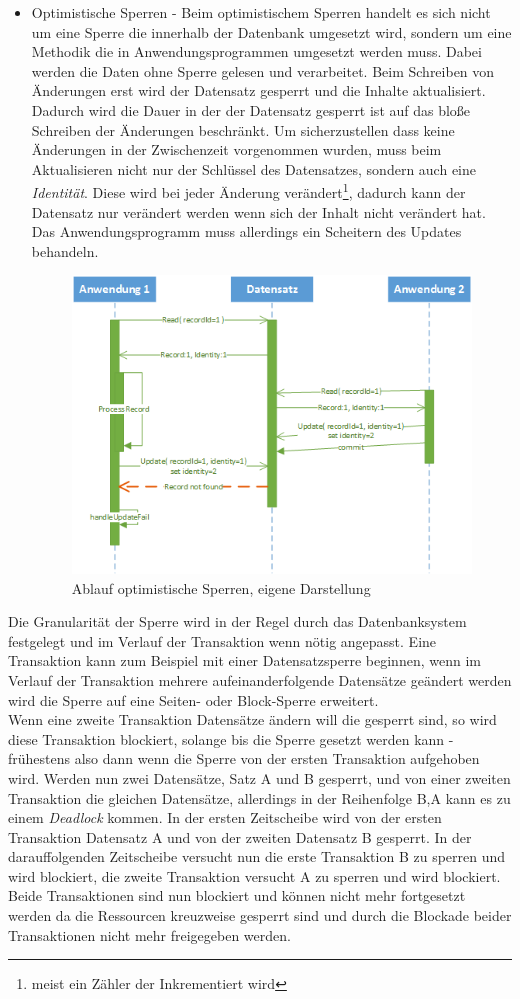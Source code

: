 \begin{itemize}
	\item Optimistische Sperren - Beim optimistischem Sperren handelt es sich nicht um eine Sperre die innerhalb der Datenbank umgesetzt wird, sondern um eine Methodik die in Anwendungsprogrammen umgesetzt werden muss. Dabei werden die Daten ohne Sperre gelesen und verarbeitet. Beim Schreiben von Änderungen erst wird der Datensatz gesperrt und die Inhalte aktualisiert. Dadurch wird die Dauer in der der Datensatz gesperrt ist auf das bloße Schreiben der Änderungen beschränkt. Um sicherzustellen dass keine Änderungen in der Zwischenzeit vorgenommen wurden, muss beim Aktualisieren nicht nur der Schlüssel des Datensatzes, sondern auch eine \emph{Identität}. Diese wird bei jeder Änderung verändert\footnote{meist ein Zähler der Inkrementiert wird}, dadurch kann der Datensatz nur verändert werden wenn sich der Inhalt nicht verändert hat. Das Anwendungsprogramm muss allerdings ein Scheitern des Updates behandeln.\parencite[S. 366]{WeikumVossen02}
	\begin{figure}
		\centering
		\includegraphics[width=0.7\linewidth]{images/optimistic_lock.png}
		\caption{Ablauf optimistische Sperren, eigene Darstellung}
		\label{fig:optimistic_locking}
	\end{figure}
\end{itemize}
Die Granularität der Sperre wird in der Regel durch das Datenbanksystem festgelegt und im Verlauf der Transaktion wenn nötig angepasst. Eine Transaktion kann zum Beispiel mit einer Datensatzsperre beginnen, wenn im Verlauf der Transaktion mehrere aufeinanderfolgende Datensätze geändert werden wird die Sperre auf eine Seiten- oder Block-Sperre erweitert.\parencite[S. 366f]{WeikumVossen02}
\\Wenn eine zweite Transaktion Datensätze ändern will die gesperrt sind, so wird diese Transaktion blockiert, solange bis die Sperre gesetzt werden kann - frühestens also dann wenn die Sperre von der ersten Transaktion aufgehoben wird. Werden nun zwei Datensätze, Satz A und B gesperrt, und von einer zweiten Transaktion die gleichen Datensätze, allerdings in der Reihenfolge B,A kann es zu einem \emph{Deadlock} kommen. In der ersten Zeitscheibe wird von der ersten Transaktion Datensatz A und von der zweiten Datensatz B gesperrt. In der darauffolgenden Zeitscheibe versucht nun die erste Transaktion B zu sperren und wird blockiert, die zweite Transaktion versucht A zu sperren und wird blockiert. Beide Transaktionen sind nun blockiert und können nicht mehr fortgesetzt werden da die Ressourcen kreuzweise gesperrt sind und  durch die Blockade beider Transaktionen nicht mehr freigegeben werden.\parencite[S. 138]{WeikumVossen02}
